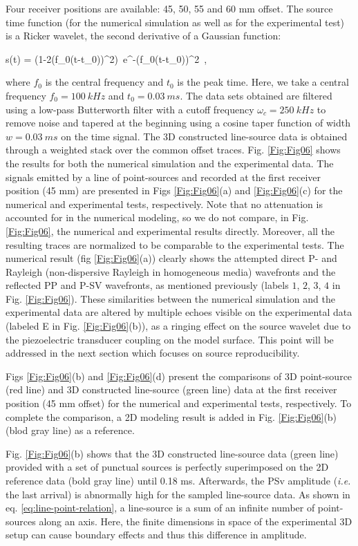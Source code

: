 \documentclass[extra,mreferee]{gji}
\begin{document}
Four receiver positions are available: 45, 50, 55 and 60 mm offset. The source time function (for the numerical simulation as well as for the experimental test) is a Ricker wavelet, the second derivative of a Gaussian function:

\equation
s(t) = (1-2(\pi f_{0}(t-t_{0}))^{2})~e^{-(\pi f_{0}(t-t_{0}))^{2}}~,
\label{eq:ricker-source} 
\endequation

where $f_{0}$ is the central frequency and $t_{0}$ is the peak time. Here, we take a central frequency $f_{0}=100\ kHz$ and $t_{0}=0.03\ ms$. The data sets obtained are filtered using a low-pass Butterworth filter with a cutoff frequency $\omega_{c}=250\ kHz$ to remove noise and tapered at the beginning using a cosine taper function of width $w=0.03\ ms$ on the time signal. The 3D constructed line-source data is obtained through a weighted stack over the common offset traces. Fig. \ref{Fig:Fig06} shows the results for both the numerical simulation and the experimental data. The signals emitted by a line of point-sources and recorded at the first receiver position (45 mm) are presented in Figs \ref{Fig:Fig06}(a) and \ref{Fig:Fig06}(c) for the numerical and experimental tests, respectively. Note that no attenuation is accounted for in the numerical modeling, so we do not compare, in Fig. \ref{Fig:Fig06}, the numerical and experimental results directly. Moreover, all the resulting traces are normalized to be comparable to the experimental tests. The numerical result (fig \ref{Fig:Fig06}(a)) clearly shows the attempted direct P- and Rayleigh (non-dispersive Rayleigh in homogeneous media) wavefronts and the reflected PP and P-SV wavefronts, as mentioned previously (labels $1$, $2$, $3$, $4$ in Fig. \ref{Fig:Fig06}). These similarities between the numerical simulation and the experimental data are altered by multiple echoes visible on the experimental data (labeled E in Fig. \ref{Fig:Fig06}(b)), as a ringing effect on the source wavelet due to the piezoelectric transducer coupling on the model surface. This point will be addressed in the next section which focuses on source reproducibility. 

Figs \ref{Fig:Fig06}(b) and \ref{Fig:Fig06}(d) present the comparisons of 3D point-source (red line) and 3D constructed line-source (green line) data at the first receiver position (45 mm offset) for the numerical and experimental tests, respectively. To complete the comparison, a 2D modeling result is added in Fig. \ref{Fig:Fig06}(b) (blod gray line) as a reference.

Fig. \ref{Fig:Fig06}(b) shows that the 3D constructed line-source data (green line) provided with a set of punctual sources is perfectly superimposed on the 2D reference data (bold gray line) until 0.18 ms. Afterwards, the PSv amplitude (\textit{i.e.} the last arrival) is abnormally high for the sampled line-source data. As shown in eq. \ref{eq:line-point-relation}, a line-source is a sum of an infinite number of point-sources along an axis. Here, the finite dimensions in space of the experimental 3D setup can cause boundary effects and thus this difference in amplitude.
\end{document}
